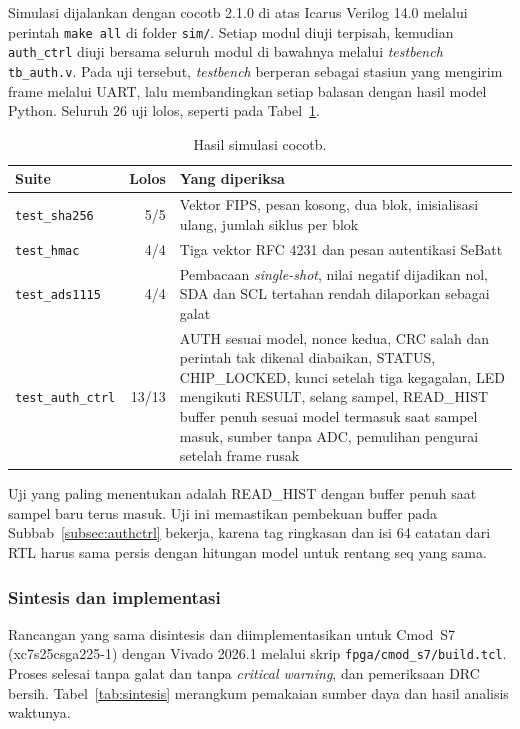 \documentclass[11pt,a4paper]{article}
\begin{document}
Simulasi dijalankan dengan cocotb 2.1.0 di atas Icarus Verilog 14.0 melalui perintah
\texttt{make all} di folder \texttt{sim/}. Setiap modul diuji terpisah, kemudian
\texttt{auth\_ctrl} diuji bersama seluruh modul di bawahnya melalui \textit{testbench}
\texttt{tb\_auth.v}. Pada uji tersebut, \textit{testbench} berperan sebagai stasiun yang mengirim
frame melalui UART, lalu membandingkan setiap balasan dengan hasil model Python. Seluruh 26 uji
lolos, seperti pada Tabel~\ref{tab:ujicocotb}.

\begin{table}[H]
  \centering
  \small
  \begin{tabularx}{\textwidth}{l r X}
    \toprule
    Suite & Lolos & Yang diperiksa \\
    \midrule
    \texttt{test\_sha256} & 5/5 & Vektor FIPS, pesan kosong, dua blok, inisialisasi ulang, jumlah
      siklus per blok \\
    \texttt{test\_hmac} & 4/4 & Tiga vektor RFC 4231 dan pesan autentikasi SeBatt \\
    \texttt{test\_ads1115} & 4/4 & Pembacaan \textit{single-shot}, nilai negatif dijadikan nol,
      SDA dan SCL tertahan rendah dilaporkan sebagai galat \\
    \texttt{test\_auth\_ctrl} & 13/13 & AUTH sesuai model, nonce kedua, CRC salah dan perintah tak
      dikenal diabaikan, STATUS, CHIP\_LOCKED, kunci setelah tiga kegagalan, LED mengikuti RESULT,
      selang sampel, READ\_HIST buffer penuh sesuai model termasuk saat sampel masuk, sumber tanpa
      ADC, pemulihan pengurai setelah frame rusak \\
    \bottomrule
  \end{tabularx}
  \caption{Hasil simulasi cocotb.}
  \label{tab:ujicocotb}
\end{table}

Uji yang paling menentukan adalah READ\_HIST dengan buffer penuh saat sampel baru terus masuk. Uji
ini memastikan pembekuan buffer pada Subbab~\ref{subsec:authctrl} bekerja, karena tag ringkasan
dan isi 64 catatan dari RTL harus sama persis dengan hitungan model untuk rentang seq yang sama.

\subsubsection*{Sintesis dan implementasi}

Rancangan yang sama disintesis dan diimplementasikan untuk Cmod~S7 (xc7s25csga225-1) dengan
Vivado 2026.1 melalui skrip \texttt{fpga/cmod\_s7/build.tcl}. Proses selesai tanpa galat dan tanpa
\textit{critical warning}, dan pemeriksaan DRC bersih. Tabel~\ref{tab:sintesis} merangkum
pemakaian sumber daya dan hasil analisis waktunya.
\end{document}
